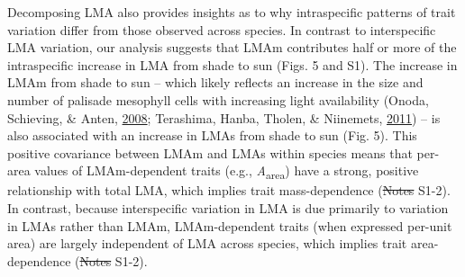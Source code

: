 \documentclass[12pt,]{article}
\theoremstyle{definition}
\theoremstyle{definition}
\theoremstyle{definition}
\theoremstyle{remark}
\providecommand{\DIFaddtex}[1]{{\protect\color{blue}\uwave{#1}}} %
\providecommand{\DIFdeltex}[1]{{\protect\color{red}\sout{#1}}}                      %
\providecommand{\DIFaddbegin}{} %
\providecommand{\DIFaddend}{} %
\providecommand{\DIFdelbegin}{} %
\providecommand{\DIFdelend}{} %
\providecommand{\DIFadd}[1]{\texorpdfstring{\DIFaddtex{#1}}{#1}} %
\providecommand{\DIFdel}[1]{\texorpdfstring{\DIFdeltex{#1}}{}} %
\newcommand{\DIFscaledelfig}{0.5}
\newlength{\DIFdelgraphicswidth} %
\newlength{\DIFdelgraphicsheight} %
\newcommand{\DIFaddincludegraphics}[2][]{{\color{blue}\fbox{\DIFOincludegraphics[#1]{#2}}}} %
\newcommand{\DIFdelincludegraphics}[2][]{%
\sbox{\DIFdelgraphicsbox}{\DIFOincludegraphics[#1]{#2}}%
\settoboxwidth{\DIFdelgraphicswidth}{\DIFdelgraphicsbox} %
\settoboxtotalheight{\DIFdelgraphicsheight}{\DIFdelgraphicsbox} %
\scalebox{\DIFscaledelfig}{%
\parbox[b]{\DIFdelgraphicswidth}{\usebox{\DIFdelgraphicsbox}\\[-\baselineskip] \rule{\DIFdelgraphicswidth}{0em}}\llap{\resizebox{\DIFdelgraphicswidth}{\DIFdelgraphicsheight}{%
\setlength{\unitlength}{\DIFdelgraphicswidth}%
\begin{picture}(1,1)%
\thicklines\linethickness{2pt} %
{\color[rgb]{1,0,0}\put(0,0){\framebox(1,1){}}}%
{\color[rgb]{1,0,0}\put(0,0){\line( 1,1){1}}}%
{\color[rgb]{1,0,0}\put(0,1){\line(1,-1){1}}}%
\end{picture}%
}\hspace*{3pt}}} %
} %
\DeclareRobustCommand{\DIFaddbegin}{\DIFOaddbegin \let\includegraphics\DIFaddincludegraphics} %
\DeclareRobustCommand{\DIFaddend}{\DIFOaddend \let\includegraphics\DIFOincludegraphics} %
\DeclareRobustCommand{\DIFdelbegin}{\DIFOdelbegin \let\includegraphics\DIFdelincludegraphics} %
\DeclareRobustCommand{\DIFdelend}{\DIFOaddend \let\includegraphics\DIFOincludegraphics} %
\begin{document}
\begin{itemize}
\DIFdelend Decomposing LMA also provides
insights as to why intraspecific patterns of trait variation differ from
those observed across species. In contrast to interspecific LMA
variation, our analysis suggests that LMAm contributes half or more of
the intraspecific increase in LMA from shade to sun (Figs. 5 and S1).
The increase in LMAm from shade to sun -- which likely reflects an
increase in the size and number of palisade mesophyll cells with
increasing light availability (Onoda, Schieving, \& Anten,
\protect\hyperlink{ref-Onoda2008}{2008}; Terashima, Hanba, Tholen, \&
Niinemets, \protect\hyperlink{ref-Terashima2011}{2011}) -- is also
associated with an increase in LMAs from shade to sun (Fig. 5). This
positive covariance between LMAm and LMAs within species means that
per-area values of LMAm-dependent traits (e.g.,
\emph{A}\textsubscript{area}) have a strong, positive relationship with
total LMA, which implies trait mass-dependence (\DIFdelbegin \DIFdel{Notes }\DIFdelend \DIFaddbegin \DIFadd{Supplement }\DIFaddend S1-2). In
contrast, because interspecific variation in LMA is due primarily to
variation in LMAs rather than LMAm, LMAm-dependent traits (when
expressed per-unit area) are largely independent of LMA across species,
which implies trait area-dependence (\DIFdelbegin \DIFdel{Notes }\DIFdelend \DIFaddbegin \DIFadd{Supplement }\DIFaddend S1-2).


\end{itemize}
\end{document}
